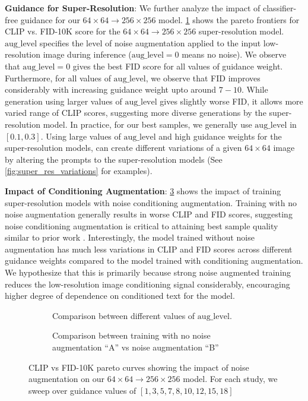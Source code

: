 \textbf{Guidance for Super-Resolution}: We further analyze the impact of classifier-free guidance for our $64\times64 \rightarrow 256\times256$ model. \cref{fig:256x256_t_eval_and_gw} shows the pareto frontiers for CLIP vs. FID-10K score for the $64\times64 \rightarrow 256\times256$ super-resolution model. $\mathrm{aug\_level}$ specifies the level of noise augmentation applied to the input low-resolution image during inference ($\mathrm{aug\_level} = 0$ means no noise). We observe that $\mathrm{aug\_level} = 0$ gives the best FID score for all values of guidance weight. Furthermore, for all values of $\mathrm{aug\_level}$, we observe that FID improves considerably with increasing guidance weight upto around $7-10$. While generation using larger values of $\mathrm{aug\_level}$ gives slightly worse FID, it allows more varied range of CLIP scores, suggesting more diverse generations by the super-resolution model. In practice, for our best samples, we generally use $\mathrm{aug\_level}$ in $[0.1, 0.3]$. Using large values of $\mathrm{aug\_level}$ and high guidance weights for the super-resolution models, \name can create different variations of a given $64\times64$ image by altering the prompts to the super-resolution models (See \cref{fig:super_res_variations} for examples).

\textbf{Impact of Conditioning Augmentation}: \cref{fig:super_res_ablation} shows the impact of training super-resolution models with noise conditioning augmentation. Training with no noise augmentation generally results in worse CLIP and FID scores, suggesting noise conditioning augmentation is critical to attaining best sample quality similar to prior work \cite{ho2021cascaded}. Interestingly, the model trained without noise augmentation has much less variations in CLIP and FID scores across different guidance weights compared to the model trained with conditioning augmentation. We hypothesize that this is primarily because strong noise augmented training reduces the low-resolution image conditioning signal considerably, encouraging higher degree of dependence on conditioned text for the model. 

\begin{figure}[t]
    \centering
    \begin{subfigure}[t]{0.49\textwidth}
    
    \caption{Comparison between different values of $\mathrm{aug\_level}$.}
     \label{fig:256x256_t_eval_and_gw}
    \end{subfigure}
    \begin{subfigure}[t]{0.49\textwidth}
     \centering
     
      \caption{Comparison between training with no noise augmentation ``A'' vs noise augmentation ``B''}
      \label{fig:super_res_ablation}
    \end{subfigure}
    \caption{CLIP vs FID-10K pareto curves showing the impact of noise augmentation on our $64\times64 \rightarrow 256\times256$ model. For each study, we sweep over guidance values of $[1, 3, 5, 7, 8, 10, 12, 15, 18]$}
\end{figure}

